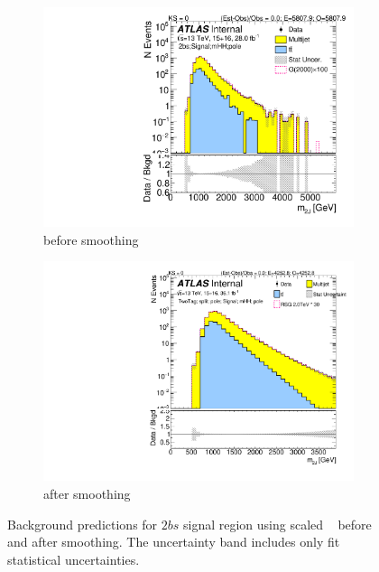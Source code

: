 \begin{figure}[htb!]
  \centering
  \captionsetup{justification=centering}
    \begin{subfigure}[b]{0.41\textwidth}
        \includegraphics[width=\textwidth,angle=-90]{figures/boosted/Signal/b77_TwoTag_split_Signal_mHH_pole_1_blind.pdf}
        \caption{before smoothing}
        \label{fig:signal-region-mjjscaled-smoothing-2b-qcd}
    \end{subfigure}
    \quad \quad \quad 
    \begin{subfigure}[b]{0.41\textwidth}
        \includegraphics[width=\textwidth,angle=-90]{figures/boosted/Smooth/Moriond_bkg_9_TwoTag_split_pole_Signal_mHH_pole_1_blind.pdf}
        \caption{after smoothing}
        \label{fig:signal-region-mjjscaled-smoothing-2b-ttbar}
    \end{subfigure}
    \caption{Background predictions for $2bs$ signal region using scaled \mtwoJ~ before and after smoothing. The uncertainty band includes only fit statistical uncertainties.}
  \label{fig:signal-region-mjjscaled-smooth-bkg-nosys-2b}
\end{figure}

